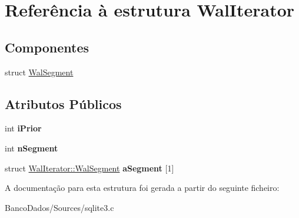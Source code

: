 \hypertarget{struct_wal_iterator}{\section{Referência à estrutura Wal\-Iterator}
\label{struct_wal_iterator}
}
\subsection*{Componentes}
\begin{DoxyCompactItemize}
\item 
struct \hyperlink{struct_wal_iterator_1_1_wal_segment}{Wal\-Segment}
\end{DoxyCompactItemize}
\subsection*{Atributos Públicos}
\begin{DoxyCompactItemize}
\item 
\hypertarget{struct_wal_iterator_a2f906125490dd3e967fc53768b03abbb}{int {\bfseries i\-Prior}}\label{struct_wal_iterator_a2f906125490dd3e967fc53768b03abbb}

\item 
\hypertarget{struct_wal_iterator_ad81bc9447d6043212289d127dc9fdafa}{int {\bfseries n\-Segment}}\label{struct_wal_iterator_ad81bc9447d6043212289d127dc9fdafa}

\item 
\hypertarget{struct_wal_iterator_a6d3fcaaeeca5a0eee46f9fa7c3cb669b}{struct \hyperlink{struct_wal_iterator_1_1_wal_segment}{Wal\-Iterator\-::\-Wal\-Segment} {\bfseries a\-Segment} \mbox{[}1\mbox{]}}\label{struct_wal_iterator_a6d3fcaaeeca5a0eee46f9fa7c3cb669b}

\end{DoxyCompactItemize}


A documentação para esta estrutura foi gerada a partir do seguinte ficheiro\-:\begin{DoxyCompactItemize}
\item 
Banco\-Dados/\-Sources/sqlite3.\-c\end{DoxyCompactItemize}
